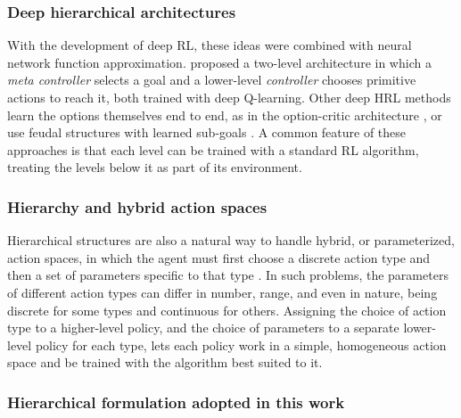 \documentclass[preprint,10pt]{elsarticle}
\begin{document}
\subsubsection*{Deep hierarchical architectures}

With the development of deep RL, these ideas were combined with neural network function approximation. \citet{kulkarni2016hierarchical} proposed a two-level architecture in which a \emph{meta controller} selects a goal and a lower-level \emph{controller} chooses primitive actions to reach it, both trained with deep Q-learning. Other deep HRL methods learn the options themselves end to end, as in the option-critic architecture \citep{bacon2017option}, or use feudal structures with learned sub-goals \citep{vezhnevets2017feudal,nachum2018data}. A common feature of these approaches is that each level can be trained with a standard RL algorithm, treating the levels below it as part of its environment.

\subsubsection*{Hierarchy and hybrid action spaces}

Hierarchical structures are also a natural way to handle hybrid, or parameterized, action spaces, in which the agent must first choose a discrete action type and then a set of parameters specific to that type \citep{masson2016reinforcement,hausknecht2016deep}. In such problems, the parameters of different action types can differ in number, range, and even in nature, being discrete for some types and continuous for others. Assigning the choice of action type to a higher-level policy, and the choice of parameters to a separate lower-level policy for each type, lets each policy work in a simple, homogeneous action space and be trained with the algorithm best suited to it.

\subsubsection*{Hierarchical formulation adopted in this work}
\end{document}
